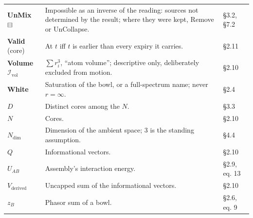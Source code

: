 \documentclass[10.5pt]{article}
\begin{document}
{\begin{longtable}{L{3.6cm}L{10.9cm}L{1.8cm}}
\textbf{UnMix} $\boxminus$ & Impossible as an inverse of the reading: sources not determined by the result; where they were kept, Remove or UnCollapse. & §3.2, §7.2 \\
\textbf{Valid} (core) & At $t$ iff $t$ is earlier than every expiry it carries. & §2.11 \\
\textbf{Volume} $\mathcal{I}_{\mathrm{vol}}$ & $\sum r_i^3$, “atom volume”; descriptive only, deliberately excluded from motion. & §2.10 \\
\textbf{White} & Saturation of the bowl, or a full-spectrum name; never $r=\infty$. & §2.4 \\
$D$ & Distinct cores among the $N$. & §3.3 \\
$N$ & Cores. & §2.10 \\
$N_{\mathrm{dim}}$ & Dimension of the ambient space; $3$ is the standing assumption. & §4.4 \\
$Q$ & Informational vectors. & §2.10 \\
$U_{AB}$ & Assembly's interaction energy. & §2.9, eq. 13 \\
$V_{\text{derived}}$ & Uncapped sum of the informational vectors. & §2.10 \\
$z_B$ & Phasor sum of a bowl. & §2.6, eq. 9 \\
\bottomrule
\end{longtable}}
\end{document}
